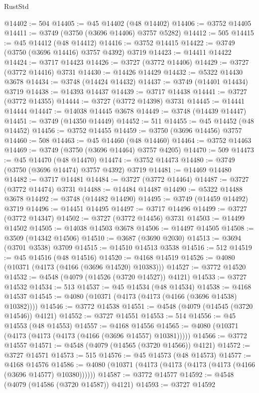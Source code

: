 \begin{lexlean}{RustStd}
\begin{coremodule}
@14402 := 504
@14405 := @45 @14402 (@48 @14402)
@14406 := @3752 @14405
@14411 := @3749 (@3750 (@3696 @14406) @3757 @5282)
@14412 := 505
@14415 := @45 @14412 (@48 @14412)
@14416 := @3752 @14415
@14422 := @3749 (@3750 (@3696 @14416) @3757 @4392) @3719
@14423 := @14411 @14422
@14424 := @3717 @14423
@14426 := @3727 (@3772 @14406)
@14429 := @3727 (@3772 @14416) @3731
@14430 := @14426 @14429
@14432 := @5322 @14430 @3678
@14434 := @3748 (@14424 @14432)
@14437 := @3749 (@14401 @14434) @3719
@14438 := @14393 @14437
@14439 := @3717 @14438
@14441 := @3727 (@3772 @14355)
@14444 := @3727 (@3772 @14398) @3731
@14445 := @14441 @14444
@14447 := @14038 @14445 @3678
@14449 := @3748 (@14439 @14447)
@14451 := @3749 (@14350 @14449)
@14452 := 511
@14455 := @45 @14452 (@48 @14452)
@14456 := @3752 @14455
@14459 := @3750 (@3696 @14456) @3757
@14460 := 508
@14463 := @45 @14460 (@48 @14460)
@14464 := @3752 @14463
@14469 := @3749 (@3750 (@3696 @14464) @3757 @4205)
@14470 := 509
@14473 := @45 @14470 (@48 @14470)
@14474 := @3752 @14473
@14480 := @3749 (@3750 (@3696 @14474) @3757 @4392) @3719
@14481 := @14469 @14480
@14482 := @3717 @14481
@14484 := @3727 (@3772 @14464)
@14487 := @3727 (@3772 @14474) @3731
@14488 := @14484 @14487
@14490 := @5322 @14488 @3678
@14492 := @3748 (@14482 @14490)
@14495 := @3749 (@14459 @14492) @3719
@14496 := @14451 @14495
@14497 := @3717 @14496
@14499 := @3727 (@3772 @14347)
@14502 := @3727 (@3772 @14456) @3731
@14503 := @14499 @14502
@14505 := @14038 @14503 @3678
@14506 := @14497 @14505
@14508 := @3509 (@14342 @14506)
@14510 := @3687 (@3690 @2030)
@14513 := @3694 (@3701 @3538) @3709
@14515 := @14510 @14513 @3538
@14516 := 512
@14519 := @45 @14516 (@48 @14516)
@14520 := @4168 @14519
@14526 := @4080 (@10371 (@4173 (@4166 (@3696 @14520) @10383)))
@14527 := @3772 @14520
@14532 := @4548 (@4079 (@14526 (@3720 @14527)) @4121)
@14533 := @3727 @14532
@14534 := 513
@14537 := @45 @14534 (@48 @14534)
@14538 := @4168 @14537
@14545 := @4080 (@10371 (@4173 (@4173 (@4166 (@3696 @14538) @10382))))
@14546 := @3772 @14538
@14551 := @4548 (@4079 (@14545 (@3720 @14546)) @4121)
@14552 := @3727 @14551
@14553 := 514
@14556 := @45 @14553 (@48 @14553)
@14557 := @4168 @14556
@14565 := @4080 (@10371 (@4173 (@4173 (@4173 (@4166 (@3696 @14557) @10381)))))
@14566 := @3772 @14557
@14571 := @4548 (@4079 (@14565 (@3720 @14566)) @4121)
@14572 := @3727 @14571
@14573 := 515
@14576 := @45 @14573 (@48 @14573)
@14577 := @4168 @14576
@14586 := @4080 (@10371 (@4173 (@4173 (@4173 (@4173 (@4166 (@3696 @14577) @10380))))))
@14587 := @3772 @14577
@14592 := @4548 (@4079 (@14586 (@3720 @14587)) @4121)
@14593 := @3727 @14592

\end{coremodule}
\end{lexlean}
